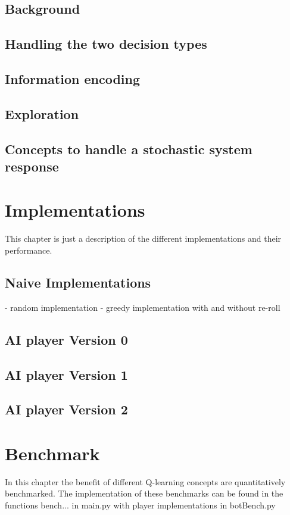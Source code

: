\documentclass{article}
\begin{document}
\subsection{Background}
\subsection{Handling the two decision types}
\subsection{Information encoding}
\subsection{Exploration}
\subsection{Concepts to handle a stochastic system response}

\section{Implementations}
This chapter is just a description of the different implementations and their performance.
\subsection{Naive Implementations}
- random implementation
- greedy implementation with and without re-roll
\subsection{AI player Version 0}
\subsection{AI player Version 1}
\subsection{AI player Version 2}

\section{Benchmark}
In this chapter the benefit of different Q-learning concepts are quantitatively benchmarked.
The implementation of these benchmarks can be found in the functions bench... in main.py with player implementations in botBench.py
\end{document}
